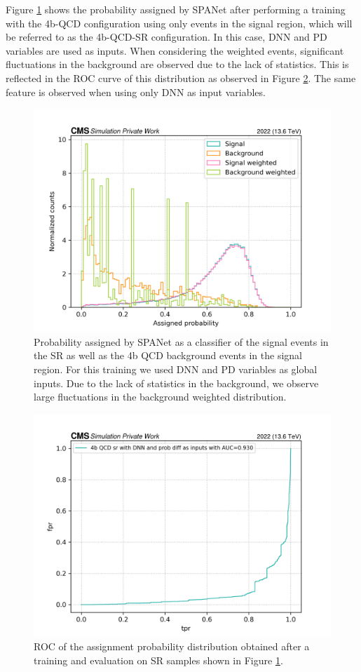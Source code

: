 Figure \ref{fig: Assigned prob 4b QCD SR} shows the probability assigned by SPANet after performing a training with the 4b-QCD configuration using only events in the signal region, which will be referred to as the 4b-QCD-SR configuration. In this case, DNN and PD variables are used as inputs. When considering the weighted events, significant fluctuations in the background are observed due to the lack of statistics. This is reflected in the ROC curve of this distribution as observed in Figure \ref{fig: ROC of the assignment proba SR}.  The same feature is observed when using only DNN as input variables.

\begin{figure}[hbt]
    \centering
    \includegraphics[width=0.7\linewidth]{Images/7.S:B/SR stats/4b stats SR class output.png}
    \caption{Probability assigned by SPANet as a classifier of the signal events in the SR as well as the 4b QCD background events in the signal region. For this training we used DNN and PD variables as global inputs. Due to the lack of statistics in the background, we observe large fluctuations in the background weighted distribution.}
    \label{fig: Assigned prob 4b QCD SR}
\end{figure}

\begin{figure}[hbt]
    \centering
    \includegraphics[width=0.7\linewidth]{Images/7.S:B/SR stats/ROC 4b QCD SR dnn proba.png}
    \caption{ROC of the assignment probability distribution obtained after a training and evaluation on SR samples shown in Figure \ref{fig: Assigned prob 4b QCD SR}.}
    \label{fig: ROC of the assignment proba SR}
\end{figure}

